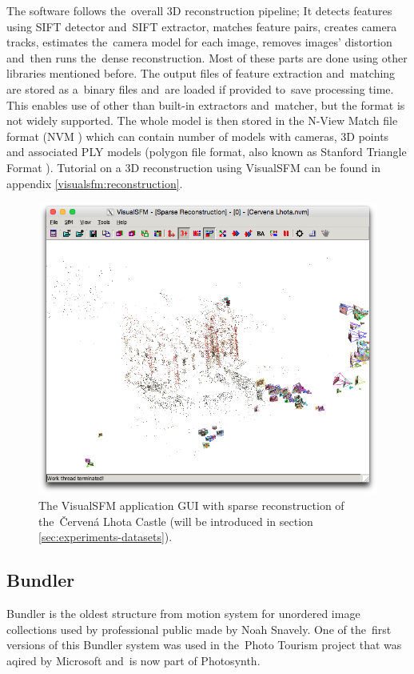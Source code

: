 The software follows the~overall 3D reconstruction pipeline; It detects features using SIFT detector and~SIFT extractor, matches feature pairs, creates camera tracks, estimates the~camera model for each image, removes images' distortion and~then runs the~dense reconstruction. Most of these parts are done using other libraries mentioned before. The output files of feature extraction and~matching are stored as a~binary files and~are loaded if provided to~save processing time. This enables use of other than built-in extractors and~matcher, but the format is not widely supported. The whole model is then stored in the N-View Match file format (NVM \cite{www:nvm}) which can contain number of models with cameras, 3D points and associated PLY models (polygon file format, also known as Stanford Triangle Format \cite{ply-format}). Tutorial on a 3D reconstruction using VisualSFM can be found in appendix \ref{visualsfm:reconstruction}.

\begin{figure}[ht]
	\begin{center}
		\includegraphics[keepaspectratio,width=\textwidth]{fig/VisualSFM.png}
	\end{center}
	\caption{The VisualSFM application GUI with sparse reconstruction of the~Červená Lhota Castle (will be introduced in section \ref{sec:experiments-datasets}).}
	\label{fig:visualsfm}
\end{figure}

\subsection*{Bundler}
Bundler is the oldest structure from motion system for unordered image collections used by professional public made by Noah Snavely. One of the~first versions of this Bundler system was used in the~Photo Tourism project that was aqired by Microsoft and~is now part of Photosynth. 

